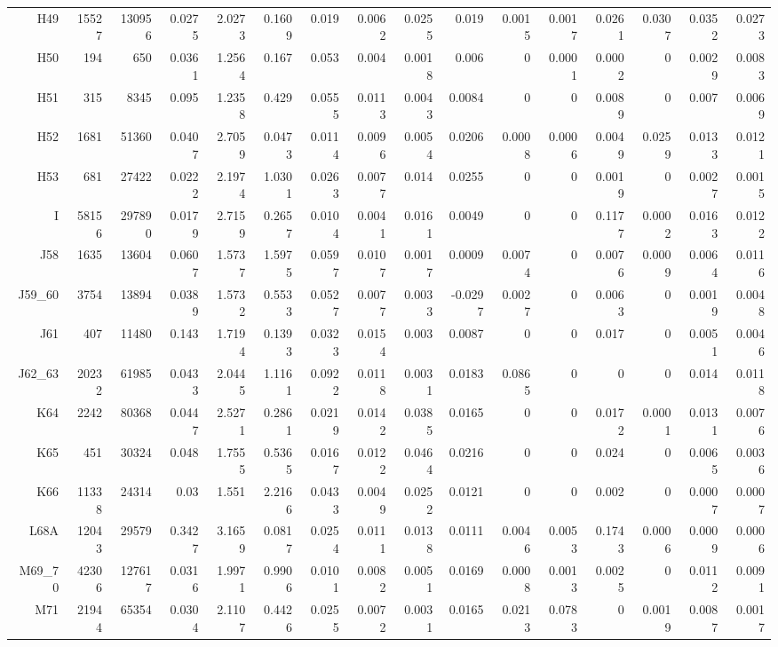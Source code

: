 \begin{table}
\begin{tabular}{rrrrrrrrrrrrrrrr}
H49 & 15527 & 130956 & 0.0275 & 2.0273 & 0.1609 & 0.019 & 0.0062 & 0.0255 & 0.019 & 0.0015 & 0.0017 & 0.0261 & 0.0307 & 0.0352 & 0.0273 \\
H50 & 194 & 650 & 0.0361 & 1.2564 & 0.167 & 0.053 & 0.004 & 0.0018 & 0.006 & 0 & 0.0001 & 0.0002 & 0 & 0.0029 & 0.0083 \\
H51 & 315 & 8345 & 0.095 & 1.2358 & 0.429 & 0.0555 & 0.0113 & 0.0043 & 0.0084 & 0 & 0 & 0.0089 & 0 & 0.007 & 0.0069 \\
H52 & 1681 & 51360 & 0.0407 & 2.7059 & 0.0473 & 0.0114 & 0.0096 & 0.0054 & 0.0206 & 0.0008 & 0.0006 & 0.0049 & 0.0259 & 0.0133 & 0.0121 \\
H53 & 681 & 27422 & 0.0222 & 2.1974 & 1.0301 & 0.0263 & 0.0077 & 0.014 & 0.0255 & 0 & 0 & 0.0019 & 0 & 0.0027 & 0.0015 \\
I & 58156 & 297890 & 0.0179 & 2.7159 & 0.2657 & 0.0104 & 0.0041 & 0.0161 & 0.0049 & 0 & 0 & 0.1177 & 0.0002 & 0.0163 & 0.0122 \\
J58 & 1635 & 13604 & 0.0607 & 1.5737 & 1.5975 & 0.0597 & 0.0107 & 0.0017 & 0.0009 & 0.0074 & 0 & 0.0076 & 0.0009 & 0.0064 & 0.0116 \\
J59\_60 & 3754 & 13894 & 0.0389 & 1.5732 & 0.5533 & 0.0527 & 0.0077 & 0.0033 & -0.0297 & 0.0027 & 0 & 0.0063 & 0 & 0.0019 & 0.0048 \\
J61 & 407 & 11480 & 0.143 & 1.7194 & 0.1393 & 0.0323 & 0.0154 & 0.003 & 0.0087 & 0 & 0 & 0.017 & 0 & 0.0051 & 0.0046 \\
J62\_63 & 20232 & 61985 & 0.0433 & 2.0445 & 1.1161 & 0.0922 & 0.0118 & 0.0031 & 0.0183 & 0.0865 & 0 & 0 & 0 & 0.014 & 0.0118 \\
K64 & 2242 & 80368 & 0.0447 & 2.5271 & 0.2861 & 0.0219 & 0.0142 & 0.0385 & 0.0165 & 0 & 0 & 0.0172 & 0.0001 & 0.0131 & 0.0076 \\
K65 & 451 & 30324 & 0.048 & 1.7555 & 0.5365 & 0.0167 & 0.0122 & 0.0464 & 0.0216 & 0 & 0 & 0.024 & 0 & 0.0065 & 0.0036 \\
K66 & 11338 & 24314 & 0.03 & 1.551 & 2.2166 & 0.0433 & 0.0049 & 0.0252 & 0.0121 & 0 & 0 & 0.002 & 0 & 0.0007 & 0.0007 \\
L68A & 12043 & 29579 & 0.3427 & 3.1659 & 0.0817 & 0.0254 & 0.0111 & 0.0138 & 0.0111 & 0.0046 & 0.0053 & 0.1743 & 0.0006 & 0.0009 & 0.0006 \\
M69\_70 & 42306 & 127617 & 0.0316 & 1.9971 & 0.9906 & 0.0101 & 0.0082 & 0.0051 & 0.0169 & 0.0008 & 0.0013 & 0.0025 & 0 & 0.0112 & 0.0091 \\
M71 & 21944 & 65354 & 0.0304 & 2.1107 & 0.4426 & 0.0255 & 0.0072 & 0.0031 & 0.0165 & 0.0213 & 0.0783 & 0 & 0.0019 & 0.0087 & 0.0017 \\

\end{tabular}
\end{table}
